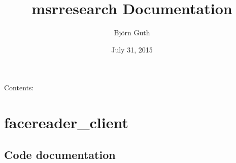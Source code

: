 \documentclass[letterpaper,10pt,english]{sphinxmanual}
\title{msrresearch Documentation}
\date{July 31, 2015}
\author{Björn Guth}
\begin{document}
\maketitle
\tableofcontents
{}\label{index::doc}


Contents:


\chapter{facereader\_client}
\label{_static/facereader:welcome-to-facereader-client-s-documentation}\label{_static/facereader::doc}\label{_static/facereader:facereader-client}

\section{Code documentation}
\label{_static/facereader:code-documentation}
\end{document}
